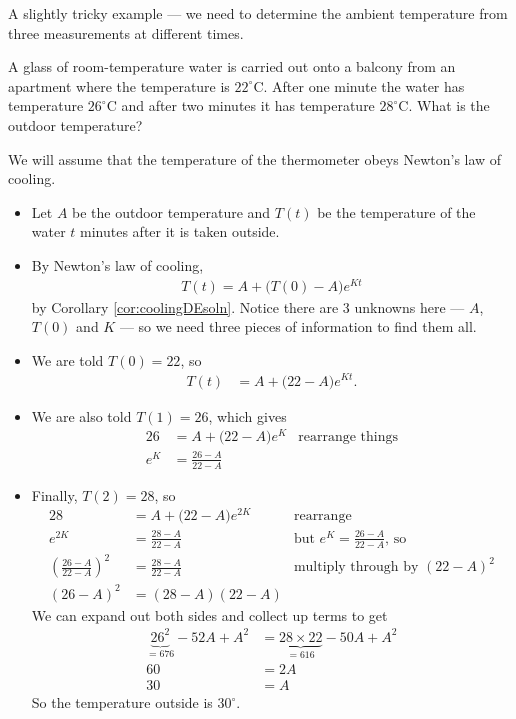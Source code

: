 \begin{eg}
\begin{itemize}
\end{itemize}

\end{eg}

A slightly tricky example --- we need to determine the ambient temperature from three
measurements at different times.
\begin{eg}\label{eg:SDEcoolingB}
A glass of room-temperature water is carried out onto a balcony from an
apartment where the temperature is $22^\circ$C. After one minute the water has
temperature $26^\circ$C and after two minutes it has temperature $28^\circ$C.
What is the outdoor temperature?

 \soln We will assume that the temperature of the thermometer obeys Newton's law
of
 cooling.
 \begin{itemize}
 \item Let $A$ be the outdoor temperature and $T(t)$ be the temperature of the
 water $t$ minutes after it is taken outside.

 \item By Newton's law of cooling,
 \begin{align*}
 T(t)=A+\big(T(0)-A\big)e^{Kt}
 \end{align*}
 by Corollary \ref{cor:coolingDEsoln}. Notice there are 3 unknowns here --- $A$,
$T(0)$
 and $K$ --- so we need three pieces of information to find them all.

 \item We are told $T(0)=22$, so
 \begin{align*}
   T(t) &=A+\big(22-A\big)e^{Kt}.
 \end{align*}
 \item We are also told $T(1)=26$, which gives
 \begin{align*}
   26 &=A+\big(22-A\big)e^{K} & \text{rearrange things}\\
   e^K&=\frac{26-A}{22-A}
 \end{align*}
 \item Finally, $T(2)=28$, so
 \begin{align*}
 28&=A+\big(22-A\big)e^{2K} & \text{rearrange}\\
 e^{2K} &= \frac{28-A}{22-A} & \text{but $e^K=\frac{26-A}{22-A}$, so}\\
 \left(\frac{26-A}{22-A}\right)^2 &=\frac{28-A}{22-A}
         & \text{multiply through by  $(22-A)^2$}\\
 (26-A)^2 &= (28-A)(22-A)
 \end{align*}
 We can expand out both sides and collect up terms to get
 \begin{align*}
 \underbrace{26^2}_{=676}-52A+A^2 &= \underbrace{28\times22}_{=616}-50A+A^2 \\
  60 &= 2A \\
   30 &= A
 \end{align*}
 So the temperature outside is $30^\circ$.
 \end{itemize}
\end{eg}




